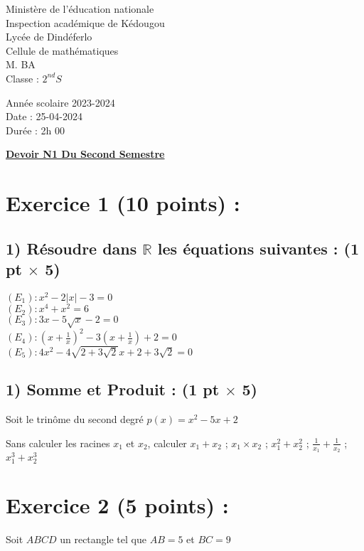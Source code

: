 \documentclass{article}
\begin{document}
\begin{minipage}{0.5\textwidth}
	Ministère de l'éducation nationale  \\
	Inspection académique de Kédougou   \\
	Lycée de Dindéferlo            \\
	Cellule de mathématiques            \\
	M. BA                          \\
	Classe : $2^{nd}S$  \\
\end{minipage}
\begin{minipage}{0.5\textwidth}
	Année scolaire 2023-2024 \\
	Date : 25-04-2024 \\
	Durée : 2h 00 \\
\end{minipage}

\begin{center}
	\textbf{{\underline{Devoir N1 Du Second Semestre}}}
\end{center}

\section*{Exercice 1 (10 points) :}
\subsection*{1) Résoudre dans $\mathbb{R}$ les équations suivantes  : (1 pt $\times$ 5)}
$(E_{1}):x^{2}-2|x|-3 = 0$\\
$(E_{2}):x^{4} + x^{2} = 6$\\
$(E_{3}):3x-5\sqrt{x}-2 = 0$\\
$(E_{4}):(x+\frac{1}{x})^{2}-3(x+\frac{1}{x})+2=0$\\
$(E_{5}):4x^{2}-4\sqrt{2+3\sqrt{2}}x+2+3\sqrt{2}=0$
\subsection*{1) Somme et Produit : (1 pt $\times$ 5)}
Soit le trinôme du second degré $p(x)=x^{2}-5x+2$

Sans calculer les racines $x_{1}$ et $x_{2}$, calculer $x_{1}+x_{2}$ ; $x_{1}\times x_{2}$ ; 
$x_{1}^{2}+x_{2}^{2}$ ; $\frac{1}{x_{1}}+\frac{1}{x_{2}}$ ; $x_{1}^{3}+x_{2}^{3}$
\section*{Exercice 2 (5 points) :}
Soit $ABCD$ un rectangle tel que $AB = 5$ et $BC = 9$
\end{document}
